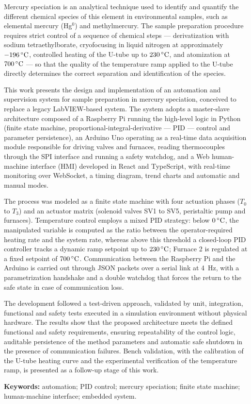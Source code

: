 Mercury speciation is an analytical technique used to identify and quantify the
different chemical species of this element in environmental samples, such as
elemental mercury (Hg$^0$) and methylmercury. The sample preparation procedure
requires strict control of a sequence of chemical steps --- derivatization with
sodium tetraethylborate, cryofocusing in liquid nitrogen at approximately
$-196\,\celsius$, controlled heating of the U-tube up to $230\,\celsius$, and
atomization at $700\,\celsius$ --- so that the quality of the temperature ramp
applied to the U-tube directly determines the correct separation and
identification of the species.

This work presents the design and implementation of an automation and
supervision system for sample preparation in mercury speciation, conceived to
replace a legacy LabVIEW-based system. The system adopts a master-slave
architecture composed of a Raspberry Pi running the high-level logic in Python
(finite state machine, proportional-integral-derivative --- PID --- control and
parameter persistence), an Arduino Uno operating as a real-time data
acquisition module responsible for driving valves and furnaces, reading
thermocouples through the SPI interface and running a safety watchdog, and a
Web human-machine interface (HMI) developed in React and TypeScript, with
real-time monitoring over WebSocket, a timing diagram, trend charts and
automatic and manual modes.

The process was modeled as a finite state machine with four actuation phases
($T_0$ to $T_3$) and an actuator matrix (solenoid valves SV1 to SV5,
peristaltic pump and furnaces). Temperature control employs a mixed PID
strategy: below $0\,\celsius$, the manipulated variable is computed as the ratio
between the operator-required heating rate and the system rate, whereas above
this threshold a closed-loop PID controller tracks a dynamic ramp setpoint up to
$230\,\celsius$; Furnace 2 is regulated at a fixed setpoint of $700\,\celsius$.
Communication between the Raspberry Pi and the Arduino is carried out through
JSON packets over a serial link at 4~Hz, with a parametrization handshake and a
double watchdog that forces the return to the safe state in case of
communication loss.

The development followed a test-driven approach, validated by unit,
integration, functional and safety tests executed in a simulation environment
without physical hardware. The results show that the proposed architecture
meets the defined functional and safety requirements, ensuring repeatability of
the control logic, auditable persistence of the method parameters and automatic
safe shutdown in the presence of communication failures. Bench validation, with
the calibration of the U-tube heating curve and the experimental verification of
the temperature ramp, is presented as a follow-up stage of this work.

\vspace{0.5cm}
\noindent\textbf{Keywords:} automation; PID control; mercury speciation;
finite state machine; human-machine interface; embedded system.
